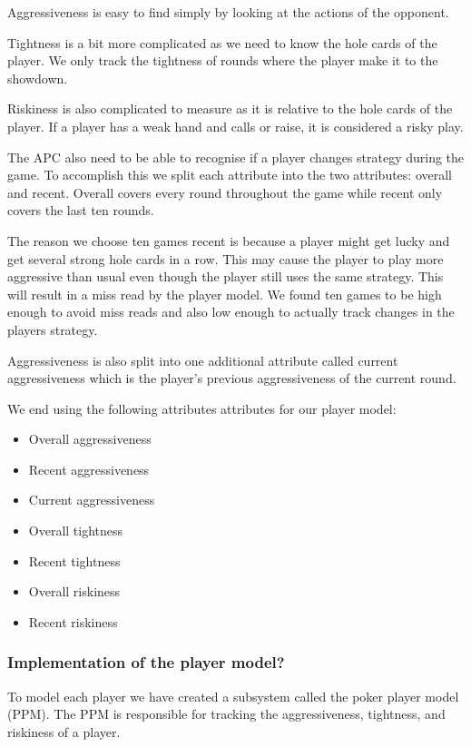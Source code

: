 Aggressiveness is easy to find simply by looking at the actions of the opponent. 

Tightness is a bit more complicated as we need to know the hole cards of the player. We only track the tightness of rounds where the player make it to the showdown.

Riskiness is also complicated to measure as it is relative to the hole cards of the player. If a player has a weak hand and calls or raise, it is considered a risky play.  

The APC also need to be able to recognise if a player changes strategy during the game. To accomplish this we split each attribute into the two attributes: overall and recent. Overall covers every round throughout the game while recent only covers the last ten rounds.

The reason we choose ten games recent is because a player might get lucky and get several strong hole cards in a row. This may cause the player to play more aggressive than usual even though the player still uses the same strategy. This will result in a miss read by the player model. We found ten games to be high enough to avoid miss reads and also low enough to actually track changes in the players strategy.

Aggressiveness is also split into one additional attribute called current aggressiveness which is the player's previous aggressiveness of the current round.

We end using the following attributes attributes for our player model:
\begin{itemize}
\item Overall aggressiveness
\item Recent aggressiveness
\item Current aggressiveness
\item Overall tightness
\item Recent tightness
\item Overall riskiness
\item Recent riskiness
\end{itemize}

\subsubsection{Implementation of the player model?}
To model each player we have created a subsystem called the poker player model (PPM). The PPM is responsible for tracking the aggressiveness, tightness, and riskiness of a player.

